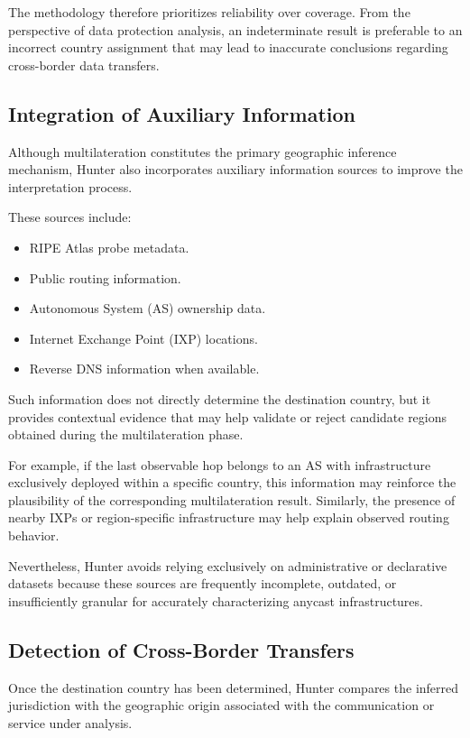 The methodology therefore prioritizes reliability over coverage. From the perspective of data protection analysis, an indeterminate result is preferable to an incorrect country assignment that may lead to inaccurate conclusions regarding cross-border data transfers.

\subsection{Integration of Auxiliary Information}

Although multilateration constitutes the primary geographic inference mechanism, Hunter also incorporates auxiliary information sources to improve the interpretation process.

These sources include:

\begin{itemize}
    \item RIPE Atlas probe metadata.
    \item Public routing information.
    \item Autonomous System (AS) ownership data.
    \item Internet Exchange Point (IXP) locations.
    \item Reverse DNS information when available.
\end{itemize}

Such information does not directly determine the destination country, but it provides contextual evidence that may help validate or reject candidate regions obtained during the multilateration phase.

For example, if the last observable hop belongs to an AS with infrastructure exclusively deployed within a specific country, this information may reinforce the plausibility of the corresponding multilateration result. Similarly, the presence of nearby IXPs or region-specific infrastructure may help explain observed routing behavior.

Nevertheless, Hunter avoids relying exclusively on administrative or declarative datasets because these sources are frequently incomplete, outdated, or insufficiently granular for accurately characterizing anycast infrastructures.

\subsection{Detection of Cross-Border Transfers}

Once the destination country has been determined, Hunter compares the inferred jurisdiction with the geographic origin associated with the communication or service under analysis.

